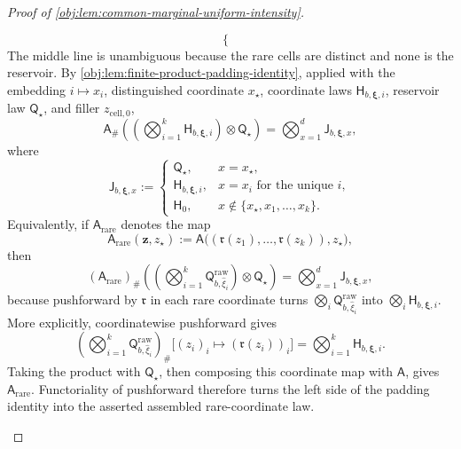 \documentclass[11pt]{article}
\begin{document}
\begin{proof}[Proof of \cref{obj:lem:common-marginal-uniform-intensity}]
\begin{enumerate}
\[\begin{cases}
\end{cases}
\]
The middle line is unambiguous because the rare cells are distinct and none is the reservoir. By \cref{obj:lem:finite-product-padding-identity}, applied with the embedding \(i\mapsto x_i\), distinguished coordinate \(x_\star\), coordinate laws \(\mathsf H_{b,\boldsymbol\xi,i}\), reservoir law \(\mathsf Q_\star\), and filler \(z_{\mathrm{cell},0}\),
\[
\mathsf A_\#\left(\left(\bigotimes_{i=1}^k
\mathsf H_{b,\boldsymbol\xi,i}\right)\otimes\mathsf Q_\star\right)
=
\bigotimes_{x=1}^d \mathsf J_{b,\boldsymbol\xi,x},
\]
where
\[
\mathsf J_{b,\boldsymbol\xi,x}
:=
\begin{cases}
\mathsf Q_\star, & x=x_\star,\\
\mathsf H_{b,\boldsymbol\xi,i}, & x=x_i\text{ for the unique }i,\\
\mathsf H_0, & x\notin\{x_\star,x_1,\ldots,x_k\}.
\end{cases}
\]
Equivalently, if \(\mathsf A_{\mathrm{rare}}\) denotes the map
\[
\mathsf A_{\mathrm{rare}}(\boldsymbol z,z_\star)
:=
\mathsf A\bigl((\mathfrak r(z_1),\ldots,\mathfrak r(z_k)),z_\star\bigr),
\]
then
\[
(\mathsf A_{\mathrm{rare}})_\#\left(\left(\bigotimes_{i=1}^k
\mathsf Q^{\mathrm{raw}}_{b,\widehat\xi_i}\right)\otimes\mathsf Q_\star\right)
=
\bigotimes_{x=1}^d \mathsf J_{b,\boldsymbol\xi,x},
\]
because pushforward by \(\mathfrak r\) in each rare coordinate turns \(\bigotimes_i\mathsf Q^{\mathrm{raw}}_{b,\widehat\xi_i}\) into \(\bigotimes_i\mathsf H_{b,\boldsymbol\xi,i}\).
More explicitly, coordinatewise pushforward gives
\[
\left(\bigotimes_{i=1}^k
\mathsf Q^{\mathrm{raw}}_{b,\widehat\xi_i}\right)_\#
\bigl[(z_i)_i\mapsto(\mathfrak r(z_i))_i\bigr]
=
\bigotimes_{i=1}^k\mathsf H_{b,\boldsymbol\xi,i}.
\]
Taking the product with \(\mathsf Q_\star\), then composing this coordinate map with
\(\mathsf A\), gives \(\mathsf A_{\mathrm{rare}}\). Functoriality of pushforward therefore turns
the left side of the padding identity into the asserted assembled rare-coordinate law.


\end{enumerate}
\end{proof}
\end{document}
